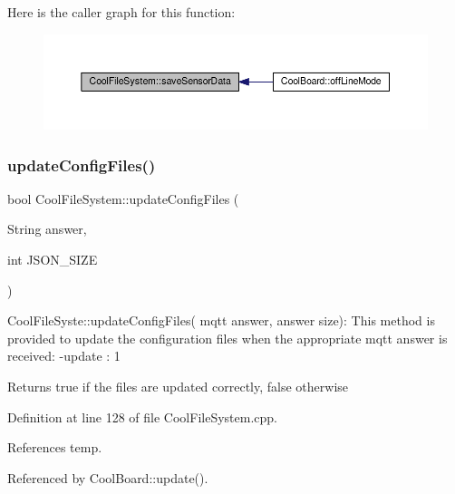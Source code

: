Here is the caller graph for this function\+:
\nopagebreak
\begin{figure}[H]
\begin{center}
\leavevmode
\includegraphics[width=350pt]{classCoolFileSystem_a4c560c2ddd40b74b7758e6ceb2c58957_icgraph}
\end{center}
\end{figure}
\mbox{\label{classCoolFileSystem_a32dad79ae80182a83e2e8f52286b7c7b}} 
\subsubsection{\texorpdfstring{update\+Config\+Files()}{updateConfigFiles()}}
{\footnotesize\ttfamily bool Cool\+File\+System\+::update\+Config\+Files (\begin{DoxyParamCaption}\item[{String}]{answer,  }\item[{int}]{J\+S\+O\+N\+\_\+\+S\+I\+ZE }\end{DoxyParamCaption})}

Cool\+File\+Syste\+::update\+Config\+Files( mqtt answer, answer size)\+: This method is provided to update the configuration files when the appropriate mqtt answer is received\+: -\/update \+: 1

\begin{DoxyReturn}{Returns}
true if the files are updated correctly, false otherwise 
\end{DoxyReturn}


Definition at line 128 of file Cool\+File\+System.\+cpp.



References temp.



Referenced by Cool\+Board\+::update().


